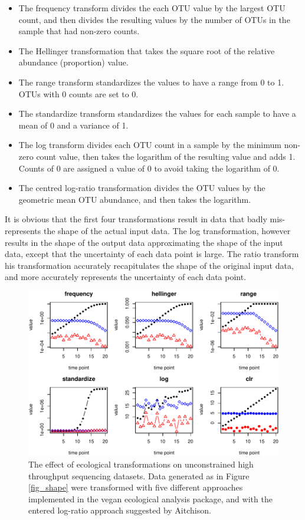 \documentclass[twocolumn]{article}
\begin{document}
\begin{itemize}
\item
  The frequency transform divides the each OTU value by the largest OTU
  count, and then divides the resulting values by the number of OTUs in
  the sample that had non-zero counts.
\item
  The Hellinger transformation that takes the square root of the
  relative abundance (proportion) value.
\item
  The range transform standardizes the values to have a range from 0 to
  1. OTUs with 0 counts are set to 0.
\item
  The standardize transform standardizes the values for each sample to
  have a mean of 0 and a variance of 1.
\item
  The log transform divides each OTU count in a sample by the minimum
  non-zero count value, then takes the logarithm of the resulting value
  and adds 1. Counts of 0 are assigned a value of 0 to avoid taking the
  logarithm of 0.
\item
  The centred log-ratio transformation divides the OTU values by the
  geometric mean OTU abundance, and then takes the logarithm.
\end{itemize}

It is obvious that the first four transformations result in data that
badly mis-represents the shape of the actual input data. The log
transformation, however results in the shape of the output data
approximating the shape of the input data, except that the uncertainty
of each data point is large. The ratio transform his transformation
accurately recapitulates the shape of the original input data, and more
accurately represents the uncertainty of each data point.

\begin{figure}[htbp]
\centering
\includegraphics{main_files/figure-latex/R_block_transformations-1.pdf}
\caption{\label{transforms} The effect of ecological transformations on
unconstrained high throughput sequencing datasets. Data generated as in
Figure \ref{fig_shape} were transformed with five different approaches
implemented in the vegan ecological analysis package, and with the
entered log-ratio approach suggested by Aitchison.}
\end{figure}
\end{document}

